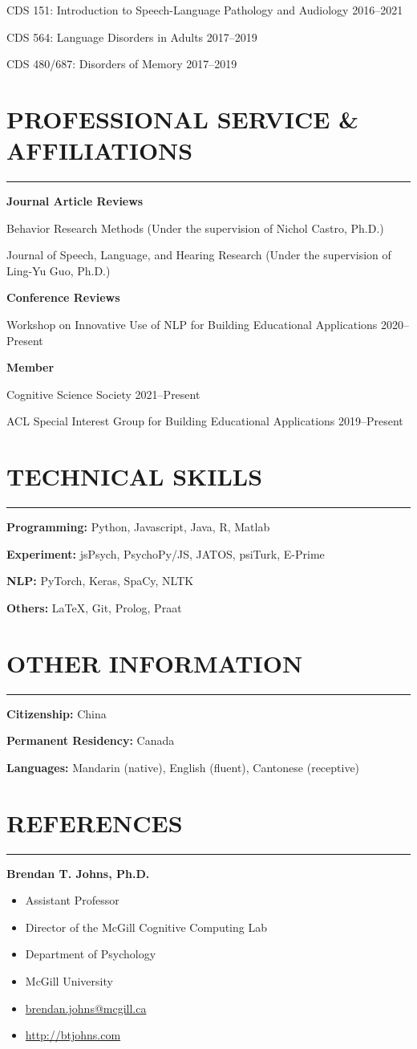 \documentclass[11pt]{article}
\newcommand{\cvsection}[1]{\vspace{-0.2cm}\section*{\Large #1}\vspace{-0.2cm}\hrule\vspace{0.2cm}}
\newcommand{\h}[1]{\hspace{15pt} #1}
\begin{document}
\h{CDS 151: Introduction to Speech-Language Pathology and Audiology} \hfill 2016--2021

\h{CDS 564: Language Disorders in Adults} \hfill 2017--2019

\h{CDS 480/687: Disorders of Memory} \hfill 2017--2019


\cvsection{PROFESSIONAL SERVICE \& AFFILIATIONS}

\textbf{Journal Article Reviews}

\h{Behavior Research Methods (Under the supervision of Nichol Castro, Ph.D.)}

\h{Journal of Speech, Language, and Hearing Research (Under the supervision of Ling-Yu Guo, Ph.D.)}

\textbf{Conference Reviews}

\h{Workshop on Innovative Use of NLP for Building Educational Applications \hfill 2020--Present}

\textbf{Member}

\h{Cognitive Science Society \hfill 2021--Present}

\h{ACL Special Interest Group for Building Educational Applications \hfill 2019--Present}



\cvsection{TECHNICAL SKILLS}

\textbf{Programming:} Python, Javascript, Java, R, Matlab

\textbf{Experiment:} jsPsych, PsychoPy/JS, JATOS, psiTurk, E-Prime

\textbf{NLP:} PyTorch, Keras, SpaCy, NLTK

\textbf{Others:} \LaTeX, Git, Prolog, Praat


\cvsection{OTHER INFORMATION}

\textbf{Citizenship:} China

\textbf{Permanent Residency:} Canada

\textbf{Languages:} Mandarin (native), English (fluent), Cantonese (receptive)


\newpage

\cvsection{REFERENCES}

\textbf{Brendan T. Johns, Ph.D.}

\begin{itemize}[leftmargin=!,labelindent=!]
    \item[] Assistant Professor
    \item[] Director of the McGill Cognitive Computing Lab
    \item[] Department of Psychology
    \item[] McGill University
    \item[] \href{mailto:brendan.johns@mcgill.ca}{brendan.johns@mcgill.ca}
    \item[] \url{http://btjohns.com}
\end{itemize}
\end{document}
